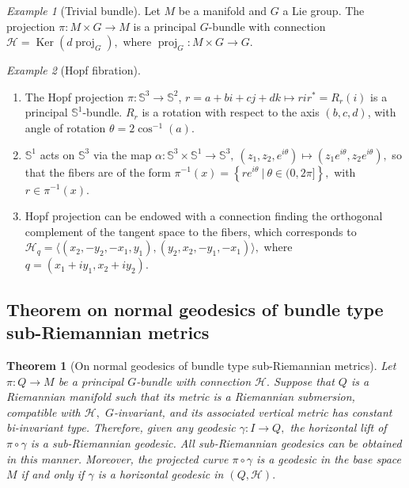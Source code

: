 \documentclass [xcolor=svgnames, t] {beamer}
\theoremstyle{definition}
\theoremstyle{plain}
\newtheorem{thm}{Theorem}
\theoremstyle{remark}
\newtheorem{ex}{Example}
\begin{document}
\begin{frame}
\begin{ex}[Trivial bundle]
	Let $ M $ be a manifold and $ G $ a Lie group. The projection $ \pi: M \times G \rightarrow M $ is a principal $ G $-bundle with connection $ \mathcal{H}= \operatorname{Ker}(  d \operatorname{proj}_G), $ 	where $ \operatorname{proj}_G : M\times G \rightarrow G. $ 
\end{ex}
\begin{ex}[Hopf fibration]
	\begin{enumerate}
		\item The Hopf projection $ \pi: \mathbb{S}^3 \rightarrow \mathbb{S}^2 $, $ r=a+bi+cj+dk \mapsto rir^*=R_{r}(i)$  is a principal $ \mathbb{S}^1  $-bundle. $R_r$ is a rotation with respect to the axis $(b,c,d)$, with angle of rotation $\theta=2\cos^{-1}(a)$.
		\item $ \mathbb{S}^1 $ acts on $ \mathbb{S}^3 $ via the map $ \alpha: \mathbb{S}^3\times \mathbb{S}^1 \rightarrow \mathbb{S}^3, \ (z_1,z_2,e^{i\theta}) \mapsto (z_1e^{i\theta},z_2e^{i\theta}), $ so that the fibers are of the form $ \pi^{-1}(x)= \left\{ re^{i\theta}\ |\ \theta\in(0,2\pi] \right\},  $ with $ r\in \pi^{-1}(x). $
		\item Hopf projection can be endowed with a connection finding the orthogonal complement of the tangent space to the fibers, which corresponds to $ \mathcal{H}_{q} = \langle(x_2,-y_2,-x_1,y_1),(y_2,x_2,-y_1,-x_1)\rangle,  $ where  	$ q=(x_1+iy_1, x_2+iy_2). $   
	\end{enumerate}
\end{ex}
\end{frame}
\subsection{Theorem on normal geodesics of bundle type sub-Riemannian metrics}%
\label{sub:theorem_on_normal_geodesics_of_bundle_type_sub_riemannian_metrics}
\begin{frame}
\begin{thm}[On normal geodesics of bundle type sub-Riemannian metrics]\label{thm:normal_geodesics}
	Let $ \pi: Q \rightarrow M $ be a principal $ G $-bundle with connection $ \mathcal{H}. $ Suppose that $ Q $ is a Riemannian manifold such that its metric is a Riemannian submersion, compatible with $ \mathcal{H}, $ $ G $-invariant, and its associated vertical metric has constant bi-invariant type. Therefore, given any geodesic $\gamma: I \rightarrow Q, $ the horizontal lift of $ \pi\circ\gamma $ is a sub-Riemannian geodesic. All sub-Riemannian geodesics can be obtained in this manner. Moreover, the projected curve $ \pi\circ\gamma$ is a geodesic in the base space $ M $ if and only if $ \gamma $ is a horizontal geodesic in $ (Q, \mathcal{H}). $ 
\end{thm}
\end{frame}
\end{document}
